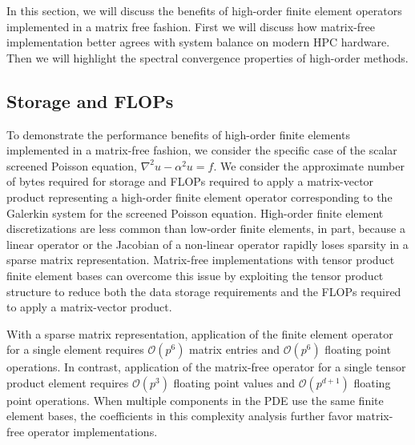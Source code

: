 In this section, we will discuss the benefits of high-order finite element operators implemented in a matrix free fashion.
First we will discuss how matrix-free implementation better agrees with system balance on modern HPC hardware.
Then we will highlight the spectral convergence properties of high-order methods.

\subsection{Storage and FLOPs}\label{sec:storageandflops}

To demonstrate the performance benefits of high-order finite elements implemented in a matrix-free fashion, we consider the specific case of the scalar screened Poisson equation, $\nabla^2 u - \alpha^2 u = f$.
We consider the approximate number of bytes required for storage and FLOPs required to apply a matrix-vector product representing a high-order finite element operator corresponding to the Galerkin system for the screened Poisson equation.
High-order finite element discretizations are less common than low-order finite elements, in part, because a linear operator or the Jacobian of a non-linear operator rapidly loses sparsity in a sparse matrix representation.
Matrix-free implementations with tensor product finite element bases can overcome this issue by exploiting the tensor product structure to reduce both the data storage requirements and the FLOPs required to apply a matrix-vector product.

With a sparse matrix representation, application of the finite element operator for a single element requires $\mathcal{O} \left( p^6 \right)$ matrix entries and $\mathcal{O} \left( p^6 \right)$ floating point operations.
In contrast, application of the matrix-free operator for a single tensor product element requires $\mathcal{O} \left( p^3 \right)$ floating point values and $\mathcal{O} \left( p^{d + 1} \right)$ floating point operations.
When multiple components in the PDE use the same finite element bases, the coefficients in this complexity analysis further favor matrix-free operator implementations.

